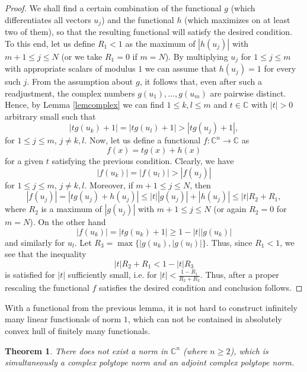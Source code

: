 \documentclass[12pt, reqno]{amsart}
\newtheorem{twr}{Theorem}[section]
\theoremstyle{definition}
\theoremstyle{remark}
\numberwithin{equation}{section}
\begin{document}
\begin{proof}
We shall find a certain combination of the functional $g$ (which differentiates all vectors $u_j$) and the functional $h$ (which maximizes on at least two of them), so that the resulting functional will satisfy the desired condition. To this end, let us define $R_1<1$ as the maximum of $|h(u_j)|$ with $m+1 \leq j \leq N$ (or we take $R_1=0$ if $m=N$). By multiplying $u_j$ for $1 \leq j \leq m$ with appropriate scalars of modulus $1$ we can assume that $h(u_j)=1$ for every such $j$. From the assumption about $g$, it follows that, even after such a readjustment, the complex numbers $g(u_1), \ldots, g(u_m)$ are pairwise distinct. Hence, by Lemma \ref{lemcomplex} we can find $1 \leq k, l \leq m$ and $t \in \mathbb{C}$ with $|t|>0$ arbitrary small such that
$$|tg(u_k)+1| = |tg(u_l)+1| > |tg(u_j)+1|,$$
for $1 \leq j \leq m$, $j \neq k, l$. Now, let us define a functional $f: \mathbb{C}^n \to \mathbb{C}$ as
$$f(x)=tg(x)+h(x)$$
for a given $t$ satisfying the previous condition. Clearly, we have
$$|f(u_k)|=|f(u_l)|>|f(u_j)|$$
for $1 \leq j \leq m$, $j \neq k, l$. Moreover, if $m+1 \leq j \leq N$, then
$$|f(u_j)| = |tg(u_j)+h(u_j)| \leq |t| |g(u_j)| + |h(u_j)| \leq |t|R_2 + R_1,$$
where $R_2$ is a maximum of $|g(u_j)|$ with $m+1 \leq j \leq N$ (or again $R_2=0$ for $m=N$). On the other hand
$$|f(u_k)| = |tg(u_k)+1| \geq 1 - |t||g(u_k)|$$
and similarly for $u_l$. Let $R_3 = \max\{|g(u_k), |g(u_l)|\}$. Thus, since $R_1<1$, we see that the inequality
$$|t|R_2 + R_1 < 1 - |t|R_3$$
is satisfied for $|t|$ sufficiently small, i.e. for $|t| < \frac{1-R_1}{R_2+R_3}$. Thus, after a proper rescaling the functional $f$ satisfies the desired condition and conclusion follows.
\end{proof}

With a functional from the previous lemma, it is not hard to construct infinitely many linear functionals of norm $1$, which can not be contained in absolutely convex hull of finitely many functionals. 

\begin{twr}
\label{twrnorms}
There does not exist a norm in $\mathbb{C}^n$ (where $n \geq 2$), which is simultaneously a complex polytope norm and an adjoint complex polytope norm.
\end{twr}
\end{document}
